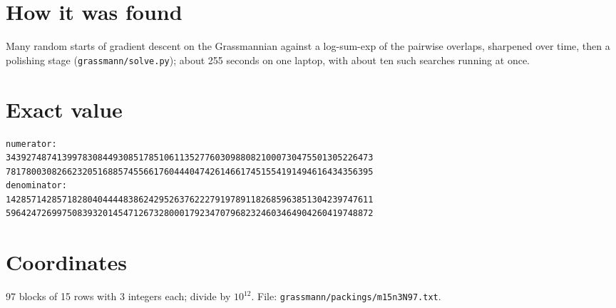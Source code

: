 \documentclass[11pt,a4paper]{article}
\begin{document}
\section{How it was found}
Many random starts of gradient descent on the Grassmannian against a log-sum-exp of the pairwise overlaps, sharpened over time, then a polishing stage (\texttt{grassmann/solve.py}); about 255 seconds on one laptop, with about ten such searches running at once.


\appendix
\section{Exact value}
{\small
\begin{verbatim}
numerator:
343927487413997830844930851785106113527760309880821000730475501305226473
781780030826623205168857455661760444047426146617451554191494616434356395
denominator:
142857142857182804044448386242952637622279197891182685963851304239747611
596424726997508393201454712673280001792347079682324603464904260419748872
\end{verbatim}}

\section{Coordinates}
97 blocks of 15 rows with 3 integers each; divide by $10^{12}$. File: \texttt{grassmann/packings/m15n3N97.txt}.
{\tiny
\begin{multicols}{3}
\end{multicols}}
\end{document}
